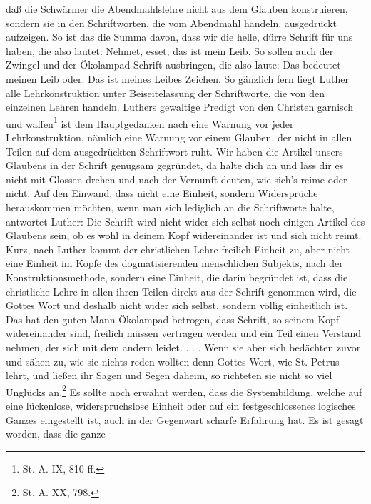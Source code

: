 da{\ss} die Schwärmer die Abendmahlslehre nicht aus dem \glqq{}Glauben\grqq{} konstruieren, sondern sie in den Schriftworten, die vom Abendmahl handeln, ausgedrückt aufzeigen. \glqq{}So ist das die Summa davon, dass wir die helle, dürre Schrift für uns haben, die also lautet: \glq{}Nehmet, esset; das ist mein Leib.\grq{}\grqq{} So sollen auch der Zwingel und der Ökolampad \glqq{}Schrift ausbringen, die also laute: \glq{}Das bedeutet meinen Leib\grq{} oder: \glq{}Das ist meines Leibes Zeichen.\grq{}\grqq{} So gänzlich fern liegt Luther alle Lehrkonstruktion unter Beiseitelassung der Schriftworte, die von den einzelnen Lehren handeln. Luthers gewaltige \glqq{}Predigt von den Christen garnisch und waffen\grqq{}\footnote{St. A. IX, 810 ff.} ist dem Hauptgedanken nach eine Warnung vor jeder Lehrkonstruktion, nämlich eine Warnung vor einem \glqq{}Glauben\grqq{}, der nicht in allen Teilen auf dem ausgedrückten Schriftwort ruht. \glqq{}Wir haben die Artikel unsers Glaubens in der Schrift genugsam gegründet, da halte dich an und lass dir es nicht mit Glossen drehen und nach der Vernunft deuten, wie sich\textquoteright{}s reime oder nicht.\grqq{} Auf den Einwand, dass nicht eine Einheit, sondern Widersprüche herauskommen möchten, wenn man sich lediglich an die Schriftworte halte, antwortet Luther: \glqq{}Die Schrift wird nicht wider sich selbst noch einigen Artikel des Glaubens sein, ob es wohl in deinem Kopf widereinander ist und sich nicht reimt.\grqq{} Kurz, nach Luther kommt der christlichen Lehre freilich \glqq{}Einheit\grqq{} zu, aber nicht eine Einheit \glqq{}im Kopfe\grqq{} des dogmatisierenden menschlichen Subjekts, nach der Konstruktionsmethode, sondern eine Einheit, die darin begründet ist, dass die christliche Lehre in allen ihren Teilen direkt aus der Schrift genommen wird, die Gottes Wort und deshalb nicht wider sich selbst, sondern völlig einheitlich ist. \glqq{}Das hat den guten Mann Ökolampad betrogen, dass Schrift, so seinem Kopf widereinander sind, freilich müssen vertragen werden und ein Teil einen Verstand nehmen, der sich mit dem andern leidet. . . . Wenn sie aber sich bedächten zuvor und sähen zu, wie sie nichts reden wollten denn Gottes Wort, wie St. Petrus lehrt, und ließen ihr Sagen und Segen daheim, so richteten sie nicht so viel Unglücks an.\grqq{}\footnote{St. A. XX, 798.} Es sollte noch erwähnt werden, dass die Systembildung, welche auf eine \glqq{}lückenlose\grqq{}, \glqq{}widerspruchslose\grqq{} Einheit oder auf ein festgeschlossenes \glqq{}logisches Ganzes\grqq{} eingestellt ist, auch in der Gegenwart scharfe Erfahrung hat. Es ist gesagt worden, dass die ganze